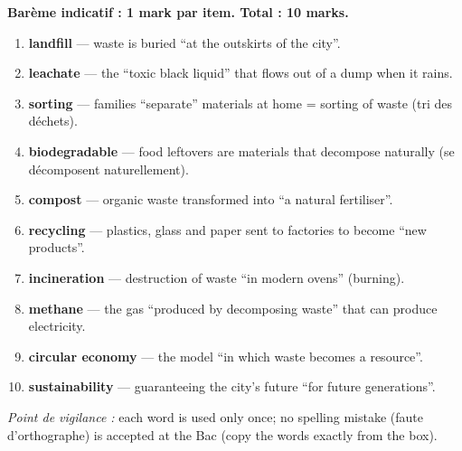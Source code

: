 \documentclass[11pt]{article}
\newcommand{\cle}[1]{{\popxbold\color{popdark}#1}}
\begin{document}
\begin{corrige}
\textbf{Barème indicatif : 1 mark par item. Total : 10 marks.}
\begin{enumerate}
\item \textbf{landfill} --- waste is buried ``at the outskirts of the city''.
\item \textbf{leachate} --- the ``toxic black liquid'' that flows out of a dump when it rains.
\item \textbf{sorting} --- families ``separate'' materials at home = \cle{sorting of waste (tri des déchets)}.
\item \textbf{biodegradable} --- food leftovers are materials that \cle{decompose naturally (se décomposent naturellement)}.
\item \textbf{compost} --- organic waste transformed into ``a natural fertiliser''.
\item \textbf{recycling} --- plastics, glass and paper sent to factories to become ``new products''.
\item \textbf{incineration} --- destruction of waste ``in modern ovens'' (burning).
\item \textbf{methane} --- the gas ``produced by decomposing waste'' that can produce electricity.
\item \textbf{circular economy} --- the model ``in which waste becomes a resource''.
\item \textbf{sustainability} --- guaranteeing the city's future ``for future generations''.
\end{enumerate}
\emph{Point de vigilance :} each word is used only once; no \cle{spelling mistake (faute d'orthographe)} is accepted at the Bac (copy the words exactly from the box).
\end{corrige}
\end{document}
